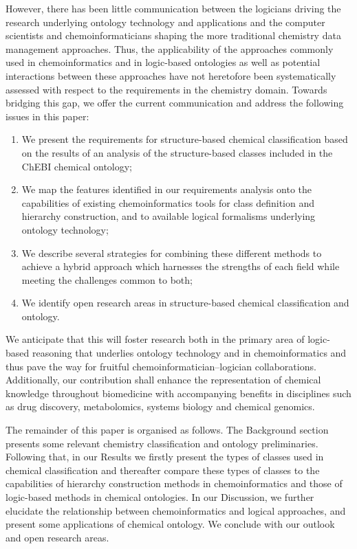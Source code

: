\documentclass[10pt]{bmc_article}
\newenvironment{bmcformat}{\baselineskip20pt\sloppy\setboolean{publ}{false}}{\baselineskip20pt\sloppy}
\begin{document}
\begin{bmcformat}
However, there has been little communication between the logicians driving the research underlying ontology technology and applications and the computer scientists and chemoinformaticians shaping the more traditional chemistry data management approaches. Thus, the applicability of the approaches commonly used in chemoinformatics and in logic-based ontologies as well as potential interactions between these approaches have not heretofore been systematically assessed with respect to the requirements in the chemistry domain. Towards bridging this gap, we offer the current communication and  address the following issues in this paper:
\begin{enumerate}
	\item We present the requirements for structure-based chemical classification based on the results of an analysis of the structure-based classes included in the ChEBI chemical ontology;
	\item We map the features identified in our requirements analysis onto the capabilities of existing chemoinformatics tools for class definition and hierarchy construction, and to available logical formalisms underlying ontology technology;
	\item We describe several strategies for combining these different methods to achieve a hybrid approach which harnesses the strengths of each field while meeting the challenges common to both;
	\item We identify open research areas in structure-based chemical classification and ontology.
\end{enumerate}
 
We anticipate that this will foster research both in the primary area of logic-based reasoning that underlies ontology technology and in chemoinformatics and thus pave the way for fruitful chemoinformatician--logician collaborations. Additionally, our contribution shall enhance the representation of chemical knowledge throughout biomedicine with accompanying benefits in disciplines such as drug discovery, metabolomics, systems biology and chemical genomics. 

The remainder of this paper is organised as follows. The Background section presents some relevant chemistry classification and ontology preliminaries.  Following that, in our Results we firstly present the types of classes used in chemical classification and thereafter compare these types of classes to the capabilities of hierarchy construction methods in chemoinformatics and those of logic-based methods in chemical ontologies. In our Discussion, we further elucidate the relationship between chemoinformatics and logical approaches, and present some applications of chemical ontology.  We conclude with our outlook and open research areas. 



\end{bmcformat}
\end{document}
